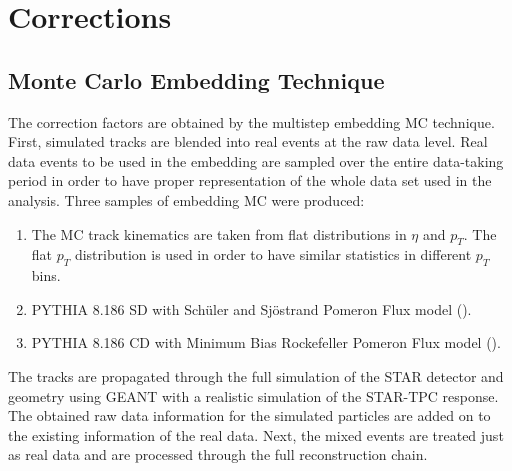 \section{Corrections}\label{sec:Corrections}
\subsection{Monte Carlo Embedding Technique}
The correction factors are obtained by the multistep
embedding MC technique. First, simulated tracks are
blended into real events at the raw data level. Real data
events to be used in the embedding are sampled over the
entire data-taking period in order to have proper representation
of the whole data set used in the analysis.  Three samples of embedding MC were produced:
\begin{enumerate}
	\item The MC track kinematics are taken
	from flat distributions in $\eta$ and $p_T$. The flat $p_T$ distribution
	is used in order to have similar statistics in different
	$p_T$ bins.
	\item PYTHIA 8.186 SD  with Sch{\"u}ler and Sj{\"o}strand Pomeron Flux model (\cite{pythia8}).
	\item PYTHIA 8.186 CD  with Minimum Bias Rockefeller Pomeron Flux model (\cite{pythia8}).
\end{enumerate}
The tracks are propagated through the full simulation of
the STAR detector and geometry using GEANT with a
realistic simulation of the STAR-TPC response. The obtained raw data 
information for the simulated particles are added on to
the existing information of the real data. Next, the mixed events are treated just as real data
and are processed through the full reconstruction chain.


